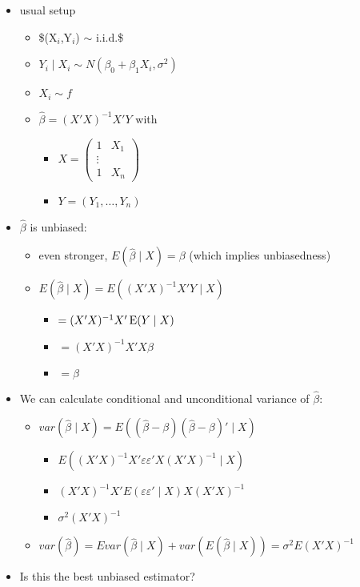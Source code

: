 \begin{itemize}
\begin{itemize}
\item usual setup
\begin{itemize}
\item \$(X$_i$,Y$_i$) $\sim$ i.i.d.\$
\item $Y_i \mid X_i \sim N(\beta_0 + \beta_1 X_i, \sigma^2)$
\item $X_i \sim f$
\item $\hat\beta = (X'X)^{-1} X'Y$ with
\begin{itemize}
\item $X = \begin{pmatrix} 1 & X_1 \\ \vdots \\ 1 & X_n \end{pmatrix}$
\item $Y = (Y_1, \dots, Y_n)$
\end{itemize}
\end{itemize}
\item $\hat\beta$ is unbiased:
\begin{itemize}
\item even stronger, $E(\hat\beta \mid X) = \beta$ (which implies unbiasedness)
\item $E(\hat\beta \mid X) = E((X'X)^{-1} X'Y \mid X)$
\begin{itemize}
\item $=(X'X)^{-1}X' \operatorname{E}(Y \mid X)$
\item $=(X'X)^{-1}X'X\beta$
\item $=\beta$
\end{itemize}
\end{itemize}
\item We can calculate conditional and unconditional variance of $\hat\beta$:
\begin{itemize}
\item $var(\hat\beta \mid X) = E((\hat\beta - \beta)(\hat\beta - \beta)' \mid X)$
\begin{itemize}
\item $E((X'X)^{-1}X'\varepsilon\varepsilon'X(X'X)^{-1} \mid X)$
\item $(X'X)^{-1}X' E(\varepsilon\varepsilon' \mid X) X(X'X)^{-1}$
\item $\sigma^2 (X'X)^{-1}$
\end{itemize}
\item $var(\hat\beta) = E var(\hat\beta \mid X) + var(E(\hat\beta \mid X)) = \sigma^2 E(X'X)^{-1}$
\end{itemize}
\item Is this the best unbiased estimator?

\end{itemize}
\end{itemize}
